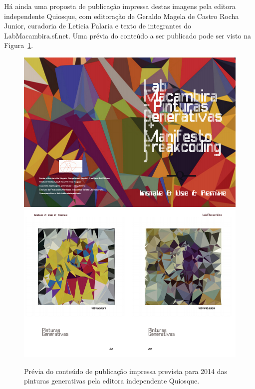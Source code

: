 Há ainda uma proposta de publicação impressa destas imagens pela
editora independente Quiosque, com editoração de Geraldo Magela de
Castro Rocha Junior, curadoria de Leticia Palaria e texto de
integrantes do LabMacambira.sf.net. Uma prévia do conteúdo a ser
publicado pode ser visto na Figura~\ref{fig:quiosque}.

\begin{figure}[htb]
  \begin{center}
    \includegraphics[width=\textwidth]{figs/quiosque1}
    \includegraphics[width=\textwidth]{figs/quiosque2}
    \caption{Prévia do conteúdo de publicação impressa prevista para
      2014 das pinturas generativas pela editora independente
      Quiosque.}
  \label{fig:quiosque}
  \end{center}
\end{figure}
